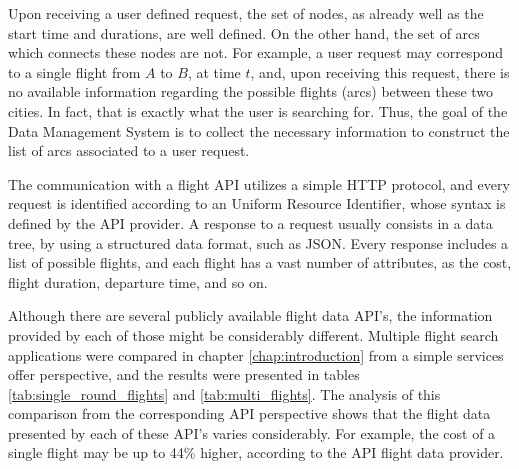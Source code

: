 Upon receiving a user defined request, the set of nodes, as already well as the start time and durations, are well defined. On the other hand, the set of arcs which connects these nodes are not. For example, a user request may correspond to a single flight from $A$ to $B$, at time $t$, and, upon receiving this request, there is no available information regarding the possible flights (arcs) between these two cities. In fact, that is exactly what the user is searching for. Thus, the goal of the Data Management System is to collect the necessary information to construct the list of arcs associated to a user request.


The communication with a flight API utilizes a simple HTTP protocol, and every request is identified according to an Uniform Resource Identifier, whose syntax is defined by the API provider. A response to a request usually consists in a data tree, by using a structured data format, such as \ac{JSON}. Every response includes a list of possible flights, and each flight has a vast number of attributes, as the cost, flight duration, departure time, and so on.

Although there are several publicly available flight data API's, the information provided by each of those might be considerably different. Multiple flight search applications were compared in chapter \ref{chap:introduction} from a simple services offer perspective, and the results were presented in tables \ref{tab:single_round_flights} and \ref{tab:multi_flights}. The analysis of this comparison from the corresponding API perspective shows that the flight data presented by each of these API's varies considerably. For example, the cost of a single flight may be up to 44\% higher, according to the API flight data provider. 

